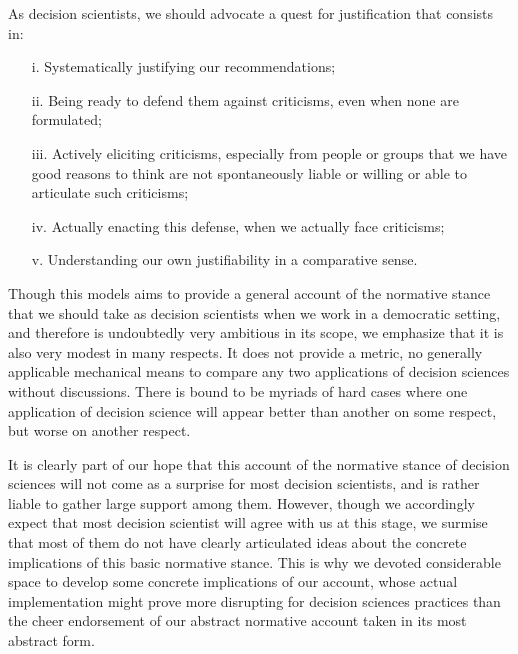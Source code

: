 \documentclass[preprint, french, english, 11pt, authoryear]{elsarticle}%
\begin{document}
As decision scientists, we should advocate a quest for justification that consists in:
\begin{itemize}
\item[i.]	Systematically justifying our recommendations;
\item[ii.]	Being ready to defend them against criticisms, even when none are formulated;
\item[iii.]	Actively eliciting criticisms, especially from people or groups that we have good reasons to think are not spontaneously liable or willing or able to articulate such criticisms;
\item[iv.]	Actually enacting this defense, when we actually face criticisms;
\item[v.]	Understanding our own justifiability in a comparative sense.
\end{itemize}

Though this models aims to provide a general account of the normative stance that we should take as decision scientists when we work in a democratic setting, and therefore is undoubtedly very ambitious in its scope, we emphasize that it is also very modest in many respects. It does not provide a metric, no generally applicable mechanical means to compare any two applications of decision sciences without discussions. There is bound to be myriads of hard cases where one application of decision science will appear better than another on some respect, but worse on another respect.

It is clearly part of our hope that this account of the normative stance of decision sciences will not come as a surprise for most decision scientists, and is rather liable to gather large support among them. However, though we accordingly expect that most decision scientist will agree with us at this stage, we surmise that most of them do not have clearly articulated ideas about the concrete implications of this basic normative stance. This is why we devoted considerable space to develop some concrete implications of our account, whose actual implementation might prove more disrupting for decision sciences practices than the cheer endorsement of our abstract normative account taken in its most abstract form.
 


\end{document}
